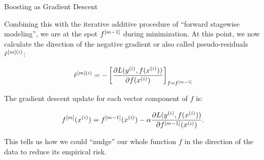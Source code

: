 \begin{vbframe}{Boosting as Gradient Descent}

\vspace*{0.2cm}
Combining this with the iterative additive procedure
of \enquote{forward stagewise modeling}, we are at the spot $f^{[m-1]}$ during minimization.
At this point, we now calculate the direction of the negative gradient or also called pseudo-residuals $\tilde{r}^{[m](i)}$:

$$ \tilde{r}^{[m](i)} = -\left[\frac{\partial{L(y^{(i)}, f(x^{(i)}))}}{\partial f(x^{(i)})}\right]_{f=f^{[m-1]}} $$

\lz

The gradient descent update for each vector component of $f$ is:

$$
  f^{[m]} (x^{(i)}) =  f^{[m-1]} (x^{(i)}) - \alpha \frac{\partial{L(y^{(i)}, f(x^{(i)}))}}{\partial f^{[m-1]} (x^{(i)})}.
$$

This tells us how we could \enquote{nudge} our whole function $f$ in the direction of the data to
reduce its empirical risk.

\end{vbframe}


